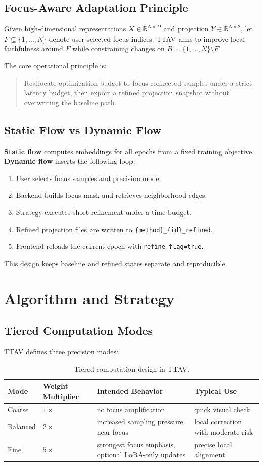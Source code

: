 \documentclass[12pt,a4paper]{report}
\newcommand{\systemname}{TTAV}
\begin{document}
\section{Focus-Aware Adaptation Principle}
Given high-dimensional representations \(X \in \mathbb{R}^{N \times D}\) and projection \(Y \in \mathbb{R}^{N \times 2}\), let \(F\subseteq\{1,\dots,N\}\) denote user-selected focus indices. \systemname{} aims to improve local faithfulness around \(F\) while constraining changes on \(B=\{1,\dots,N\}\setminus F\).

The core operational principle is:
\begin{quote}
Reallocate optimization budget to focus-connected samples under a strict latency budget, then export a refined projection snapshot without overwriting the baseline path.
\end{quote}

\section{Static Flow vs Dynamic Flow}
\textbf{Static flow} computes embeddings for all epochs from a fixed training objective. \textbf{Dynamic flow} inserts the following loop:
\begin{enumerate}
\item User selects focus samples and precision mode.
\item Backend builds focus mask and retrieves neighborhood edges.
\item Strategy executes short refinement under a time budget.
\item Refined projection files are written to \texttt{\{method\}\_\{id\}\_refined}.
\item Frontend reloads the current epoch with \texttt{refine\_flag=true}.
\end{enumerate}
This design keeps baseline and refined states separate and reproducible.

\chapter{Algorithm and Strategy}
\section{Tiered Computation Modes}
\systemname{} defines three precision modes:
\begin{table}[htbp]
\centering
\begin{tabular}{p{}p{}p{}p{}}
\toprule
Mode & Weight Multiplier & Intended Behavior & Typical Use \\
\midrule
Coarse & \(1\times\) & no focus amplification & quick visual check \\
Balanced & \(2\times\) & increased sampling pressure near focus & local correction with moderate risk \\
Fine & \(5\times\) & strongest focus emphasis, optional LoRA-only updates & precise local alignment \\
\bottomrule
\end{tabular}
\caption{Tiered computation design in \systemname{}.}
\label{tab:tiered}
\end{table}
\end{document}
